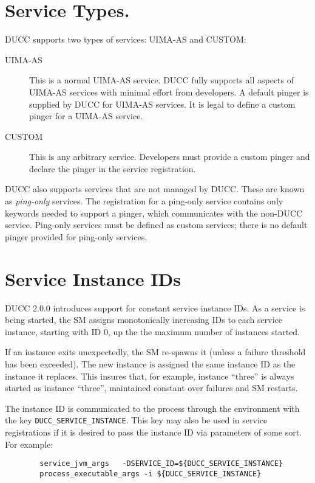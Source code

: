     \section{Service Types.}
    \label{sec:services.types}
      DUCC supports two types of services: UIMA-AS and CUSTOM:
      
      \begin{description}
          \item[UIMA-AS] This is a normal UIMA-AS service. DUCC fully supports all aspects of UIMA-AS
            services with minimal effort from developers.  A default pinger is supplied by DUCC
            for UIMA-AS services.  It is legal to define a custom pinger for a UIMA-AS service.
            
          \item[CUSTOM] This is any arbitrary service.  Developers must provide a custom pinger
            and declare the pinger in the service registration.            
      \end{description}

      DUCC also supports services that are not managed by DUCC.  These are known as {\em ping-only}
      services.  The registration for a ping-only service contains only keywords needed to support a
      pinger, which communicates with the non-DUCC service.  Ping-only services must
      be defined as custom services; there is no default pinger provided for ping-only services.

      \section{Service Instance IDs}
      \label{sec:service.service.ids}
      DUCC 2.0.0 introduces support for constant service instance IDs.  As a service is being
      started, the SM assigns monotonically increasing IDs to each service instance, starting
      with ID 0, up the the maximum number of instances started.

      If an instance exits unexpectedly, the SM re-spawns it (unless a failure threshold has been
      exceeded).  The new instance is assigned the same instance ID as the instance it replaces.
      This insures that, for example, instance ``three'' is always started as instance ``three'',
      maintained constant over failures and SM restarts.

      The instance ID is communicated to the process through the environment with the key
      {\tt DUCC\_SERVICE\_INSTANCE}.  This key may also be used in service registrations if it
      is desired to pass the instance ID via parameters of some sort.  For example:
\begin{verbatim}
        service_jvm_args   -DSERVICE_ID=${DUCC_SERVICE_INSTANCE}
        process_executable_args -i ${DUCC_SERVICE_INSTANCE}
\end{verbatim}

